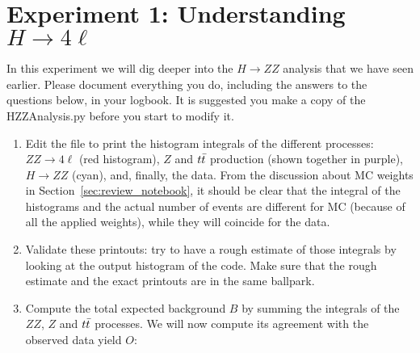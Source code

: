
\section{Experiment 1: Understanding $H\rightarrow 4\ell$}

In this experiment we will dig deeper into the $H\rightarrow ZZ$ analysis that we have seen earlier. Please document everything you do, including the answers to the questions below, in your logbook. It is suggested you make a copy of the HZZAnalysis.py before you start to modify it.

\begin{enumerate} 
\item Edit the file to print the histogram integrals of the different processes: $ZZ\rightarrow 4\ell$ (red histogram), $Z$ and $t\bar{t}$ production (shown together in purple), $H\rightarrow ZZ$ (cyan), and, finally, the data. From the discussion about MC weights in Section~\ref{sec:review_notebook}, it should be clear that the integral of the histograms and the actual number of events are different for MC (because of all the applied weights), while they will coincide for the data. 
\item Validate these printouts: try to have a rough estimate of those integrals by looking at the output histogram of the code. Make sure that the rough estimate and the exact printouts are in the same ballpark.
\item Compute the total expected background $B$ by summing the integrals of the $ZZ$, $Z$ and $t\bar{t}$ processes. We will now compute its agreement with the observed data yield $O$: 
\end{enumerate}


